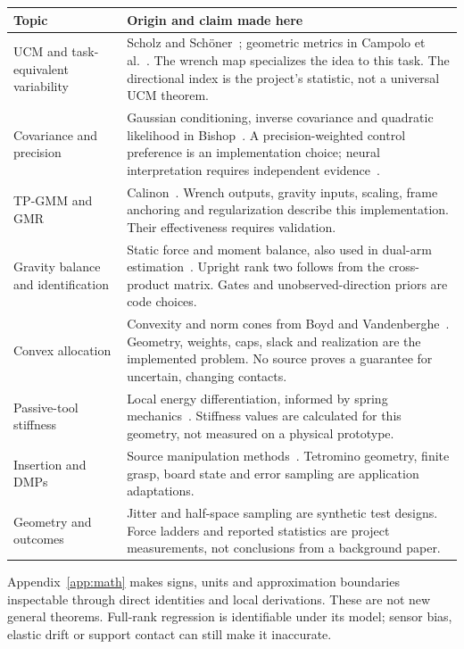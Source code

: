 \begin{longtable}{@{}p{}p{}@{}}\toprule
Topic & Origin and claim made here\\\midrule\endhead
UCM and task-equivalent variability & Scholz and Sch\"oner~\cite{scholz1999}; geometric metrics in Campolo et al.~\cite{campolo2013}. The wrench map specializes the idea to this task. The directional index is the project's statistic, not a universal UCM theorem.\\
Covariance and precision & Gaussian conditioning, inverse covariance and quadratic likelihood in Bishop~\cite[Sections 2.3 and 3.1]{bishop2006}. A precision-weighted control preference is an implementation choice; neural interpretation requires independent evidence~\cite{kutch2012}.\\
TP-GMM and GMR & Calinon~\cite{calinon2016}. Wrench outputs, gravity inputs, scaling, frame anchoring and regularization describe this implementation. Their effectiveness requires validation.\\
Gravity balance and identification & Static force and moment balance, also used in dual-arm estimation~\cite{wong2026}. Upright rank two follows from the cross-product matrix. Gates and unobserved-direction priors are code choices.\\
Convex allocation & Convexity and norm cones from Boyd and Vandenberghe~\cite{boyd2004}. Geometry, weights, caps, slack and realization are the implemented problem. No source proves a guarantee for uncertain, changing contacts.\\
Passive-tool stiffness & Local energy differentiation, informed by spring mechanics~\cite{herder2001,guest2006}. Stiffness values are calculated for this geometry, not measured on a physical prototype.\\
Insertion and DMPs & Source manipulation methods~\cite{yang2025haptic,yang2025multicontact}. Tetromino geometry, finite grasp, board state and error sampling are application adaptations.\\
Geometry and outcomes & Jitter and half-space sampling are synthetic test designs. Force ladders and reported statistics are project measurements, not conclusions from a background paper.\\
\bottomrule\end{longtable}

Appendix~\ref{app:math} makes signs, units and approximation boundaries inspectable through direct identities and local derivations. These are not new general theorems. Full-rank regression is identifiable under its model; sensor bias, elastic drift or support contact can still make it inaccurate.

